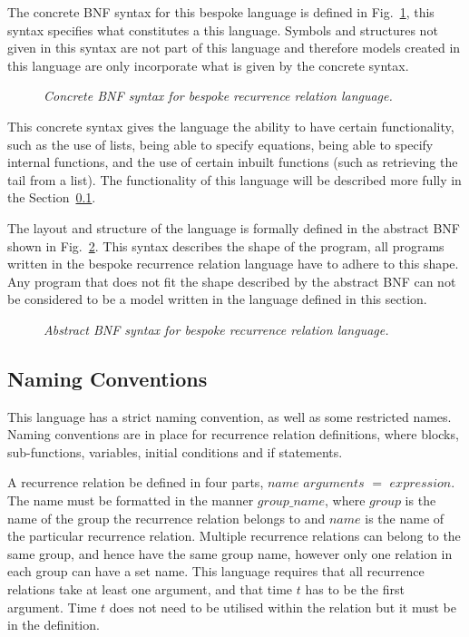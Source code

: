 \documentclass{article}
\begin{document}
The concrete BNF syntax for this bespoke language is defined in Fig.~\ref{fig:bnflex}, this syntax specifies what constitutes a this language. Symbols and structures not given in this syntax are not part of this language and therefore models created in this language are only incorporate what is given by the concrete syntax. 
\begin{figure}[H]
	\centering
	
	\caption{\it Concrete BNF syntax for bespoke recurrence relation language.}
	\label{fig:bnflex}
\end{figure} 

This concrete syntax gives the language the ability to have certain functionality, such as the use of lists, being able to specify equations, being able to specify internal functions, and the use of certain inbuilt functions (such as retrieving the tail from a list). The functionality of this language will be described more fully in the Section~\ref{nameconv}.

The layout and structure of the language is formally defined in the abstract BNF shown in Fig.~\ref{fig:BNF}. This syntax describes the shape of the program, all programs written in the bespoke recurrence relation language have to adhere to this shape. Any program that does not fit the shape described by the abstract BNF can not be considered to be a model written in the language defined in this section.  
\begin{figure}[H]
	\centering
	
	\caption{\it Abstract BNF syntax for bespoke recurrence relation language.}
	\label{fig:BNF}
\end{figure} 



\subsection{Naming Conventions} \label{nameconv}
This language has a strict naming convention, as well as some restricted names. Naming conventions are in place for recurrence relation definitions, where blocks, sub-functions, variables, initial conditions and  if statements. 

A recurrence relation be defined in four parts, $name$ $arguments$ $=$ $expression$. The name must be formatted in the manner $group\_name$, where $group$ is the name of the group the recurrence relation belongs to and $name$ is the name of the particular recurrence relation. Multiple recurrence relations can belong to the same group, and hence have the same group name, however only one relation in each group can have a set name. This language requires that all recurrence relations take at least one argument, and that time $t$ has to be the first argument. Time $t$ does not need to be utilised within the relation but it must be in the definition.     
\end{document}

